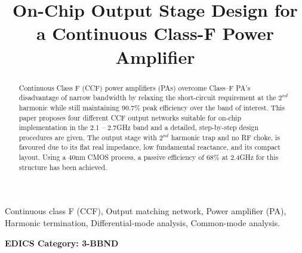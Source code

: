 \documentclass[conference]{IEEEtran}
\begin{document}
\title{On-Chip Output Stage Design for a  Continuous Class-F Power Amplifier}

\author{ 
}

\maketitle

\begin{abstract}
Continuous Class F (CCF) power amplifiers (PAs) overcome Class--F PA's disadvantage of narrow bandwidth by relaxing the short-circuit requirement at the $2^{nd}$ harmonic while still maintaining 90.7\% peak efficiency over the band of interest. This paper proposes four different CCF output networks suitable for on-chip implementation in the 2.1 -- 2.7GHz band and a detailed, step-by-step design procedures are given. The output stage with $2^{nd}$ harmonic trap and no RF choke, is favoured due to its  flat real impedance, low fundamental reactance, and its compact layout. Using a 40nm CMOS process, a passive efficiency of 68\% at 2.4GHz for this structure has been achieved.
\end{abstract}

\vspace{1mm}
\begin{IEEEkeywords}
Continuous class F (CCF), Output matching network, Power amplifier (PA), Harmonic termination, Differential-mode analysis, Common-mode analysis. 
\end{IEEEkeywords}


\ifCLASSOPTIONpeerreview
\begin{center} \bfseries EDICS Category: 3-BBND \end{center}
\fi

\IEEEpeerreviewmaketitle
\end{document}
